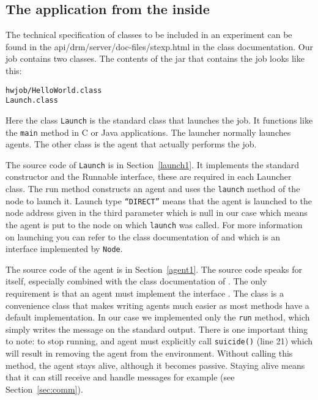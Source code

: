 \documentclass{article}
\begin{document}
\subsection{The application from the inside}

The technical specification of classes to be included in an experiment
can be found in the  
{api/drm/server/doc-files/stexp.html} in the class documentation.
Our job contains two classes.
The contents of the jar that contains the job looks like this:
\begin{verbatim}
hwjob/HelloWorld.class
Launch.class
\end{verbatim}
Here the class {\tt Launch} is the standard class that launches the job.
It functions like the {\tt main} method in C or Java applications.
The launcher normally launches agents.
The other class is the agent that actually performs the job.

The source code of {\tt Launch} is in Section~\ref{launch1}.
It implements the standard constructor and the Runnable interface, these are
required in each Launcher class.
The run method constructs an agent and uses the {\tt launch} method of
the node to launch it.
Launch type {\tt ``DIRECT''} means that the agent is launched to the node
address given in the third parameter which is null in our case which
means the agent is put to the node on which {\tt launch} was called.
For more information on launching you can refer to the class documentation
of  and
which is an interface implemented by {\tt Node}.

The source code of the agent is in Section~\ref{agent1}.
The source code speaks for itself, especially combined with the class
documentation of 
.
The only requirement is that an agent must implement the interface
.
The class 
is a convenience class that makes writing agents much easier as most methods
have a default implementation.
In our case we implemented only the {\tt run} method, which simply
writes the message on the standard output.
There is one important thing to note: to stop running, and agent must
explicitly call {\tt suicide()} (line 21) which will result in removing the
agent from the environment.
Without calling this method, the agent stays alive, although it becomes
passive.
Staying alive means that it can still receive and handle messages for
example (see Section~\ref{sec:comm}).
\end{document}
